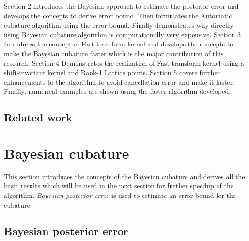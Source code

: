 \documentclass[twocolumn]{svjour3}          %
\begin{document}
Section 2 introduces the Bayesian approach to estimate the posterior error and develops the concepts to derive error bound. Then formulates the Automatic cubature algorithm using the error bound. Finally demonstrates why directly using Bayesian cubature algorithm is computationally very expensive.
Section 3 Introduces the concept of Fast transform kernel and develops the concepts to make the Bayesian cubature faster which is the major contribution of this research.
Section 4 Demonstrates the realization of Fast transform kernel using a shift-invariant kernel and Rank-1 Lattice points.
Section 5 covers further enhancements to the algorithm to avoid cancellation error and make it faster. Finally, numerical examples are shown using the faster algorithm developed.



\subsection{Related work}



\section{Bayesian cubature}
\label{sec:1}

This section introduces the concepts of the Bayesian cubature and derives all the basic results which will be used in the next section for further speedup of the algorithm. \emph{Bayesian posterior error} \cite{Fred2017} is used to estimate an error bound for the cubature. 

\subsection{Bayesian posterior error}
\label{sec:2}

\end{document}

